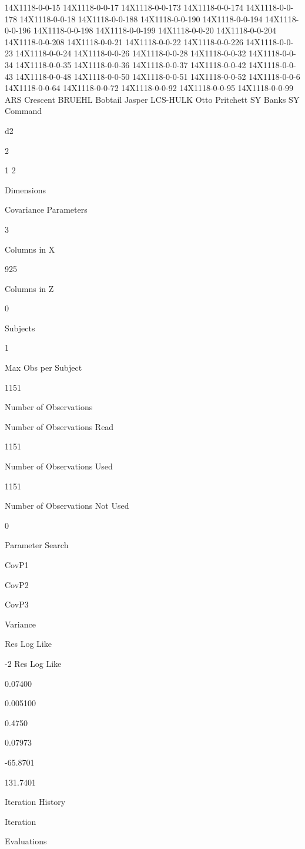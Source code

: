 \documentclass[
]{book}
\begin{document}
14X1118-0-0-15 14X1118-0-0-17 14X1118-0-0-173 14X1118-0-0-174 14X1118-0-0-178 14X1118-0-0-18 14X1118-0-0-188 14X1118-0-0-190 14X1118-0-0-194 14X1118-0-0-196 14X1118-0-0-198 14X1118-0-0-199 14X1118-0-0-20 14X1118-0-0-204 14X1118-0-0-208 14X1118-0-0-21 14X1118-0-0-22 14X1118-0-0-226 14X1118-0-0-23 14X1118-0-0-24 14X1118-0-0-26 14X1118-0-0-28 14X1118-0-0-32 14X1118-0-0-34 14X1118-0-0-35 14X1118-0-0-36 14X1118-0-0-37 14X1118-0-0-42 14X1118-0-0-43 14X1118-0-0-48 14X1118-0-0-50 14X1118-0-0-51 14X1118-0-0-52 14X1118-0-0-6 14X1118-0-0-64 14X1118-0-0-72 14X1118-0-0-92 14X1118-0-0-95 14X1118-0-0-99 ARS Crescent BRUEHL Bobtail Jasper LCS-HULK Otto Pritchett SY Banks SY Command

d2

2

1 2

Dimensions

Covariance Parameters

3

Columns in X

925

Columns in Z

0

Subjects

1

Max Obs per Subject

1151

Number of Observations

Number of Observations Read

1151

Number of Observations Used

1151

Number of Observations Not Used

0

Parameter Search

CovP1

CovP2

CovP3

Variance

Res Log Like

-2 Res Log Like

0.07400

0.005100

0.4750

0.07973

-65.8701

131.7401

Iteration History

Iteration

Evaluations
\end{document}
